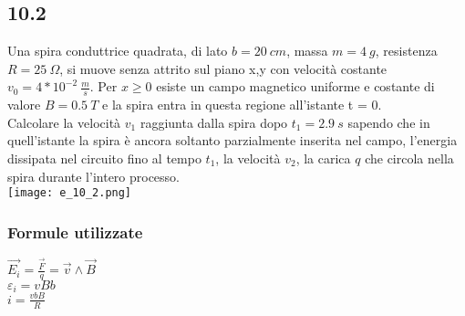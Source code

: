 \documentclass[../../main.tex]{subfiles}
\begin{document}
\subsection*{10.2}
Una spira conduttrice quadrata, di lato $b = 20\ cm$, massa $m = 4\ g$, resistenza $R = 25\ \Omega$, si muove senza attrito sul piano x,y con velocità costante $v_0 = 4 * 10^{-2}\ \frac{m}{s}$. Per $x\ge0$ esiste un campo magnetico uniforme e costante di valore $B = 0.5\ T$ e la spira entra in questa regione all'istante t = 0.\\
Calcolare la velocità $v_1$ raggiunta dalla spira dopo $t_1 = 2.9\ s$ sapendo che in quell'istante la spira è ancora soltanto parzialmente inserita nel campo, l'energia dissipata nel circuito fino al tempo $t_1$, la velocità $v_2$, la carica $q$ che circola nella spira durante l'intero processo.\\
\texttt{[image: e\_10\_2.png]}
\subsubsection*{Formule utilizzate}
$\vec{E_i} = \frac{\vec{F}}{q} = \vec{v}\wedge\vec{B}$\\
$\varepsilon_i = vBb$\\
$i = \frac{vbB}{R}$
\end{document}
